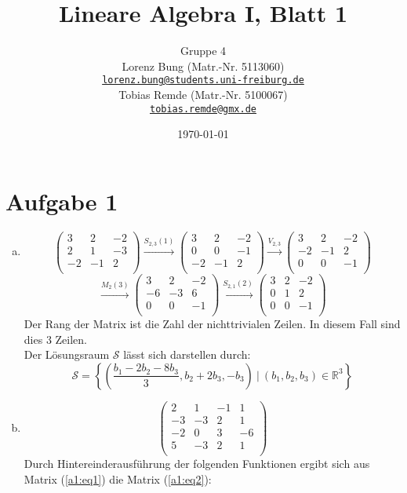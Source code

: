 \documentclass[12pt,a4paper]{article}
\title{Lineare Algebra I, Blatt 1}
\author{Gruppe 4\\
    Lorenz Bung (Matr.-Nr. 5113060)\\
    \href{mailto:lorenz.bung@students.uni-freiburg.de}{\texttt{lorenz.bung@students.uni-freiburg.de}}\\
    Tobias Remde (Matr.-Nr. 5100067)\\
    \href{mailto:tobias.remde@gmx.de}{\texttt{tobias.remde@gmx.de}}
}
\date{\today}
\begin{document}
\maketitle


\section*{Aufgabe 1}

\begin{enumerate}[(a)]
    \item \[
    \begin{pmatrix}
        3 & 2 & -2\\
        2 & 1 & -3\\
        -2 & -1 & 2\\
    \end{pmatrix} \overset{S_{2,3}(1)}{\longrightarrow}
    \begin{pmatrix}
    3 & 2 & -2\\
    0 & 0 & -1\\
    -2 & -1 & 2\\
    \end{pmatrix} \overset{V_{2,3}}{\longrightarrow}
    \begin{pmatrix}
    3 & 2 & -2\\
    -2 & -1 & 2\\
    0 & 0 & -1\\
    \end{pmatrix}
    \]
    \[
    \overset{M_2(3)}{\longrightarrow}
    \begin{pmatrix}
    3 & 2 & -2\\
    -6 & -3 & 6\\
    0 & 0 & -1\\
    \end{pmatrix} \overset{S_{2,1}(2)}{\longrightarrow}
    \begin{pmatrix}
    3 & 2 & -2\\
    0 & 1 & 2\\
    0 & 0 & -1\\
    \end{pmatrix}
    \]
    Der Rang der Matrix ist die Zahl der nichttrivialen Zeilen. In diesem Fall sind dies $3$ Zeilen.\\
    Der Lösungsraum $\mathcal{S}$ lässt sich darstellen durch:
    \[
    \mathcal{S} = \left\{\left(\frac{b_1 - 2b_2 - 8b_3}{3}, b_2 + 2b_3, -b_3\right)\ \big|\ (b_1,b_2,b_3) \in \mathbb{R}^3\right\}
    \]

    \item \begin{equation}
    \label{a1:eq1}
    \begin{pmatrix}
    2 & 1 & -1 & 1\\
    -3 & -3 & 2 & 1\\
    -2 & 0 & 3 & -6\\
    5 & -3 & 2 & 1\\
    \end{pmatrix}
    \end{equation}
    Durch Hintereinderausführung der folgenden Funktionen ergibt sich aus Matrix (\ref{a1:eq1}) die Matrix (\ref{a1:eq2}):


\end{enumerate}
\end{document}
